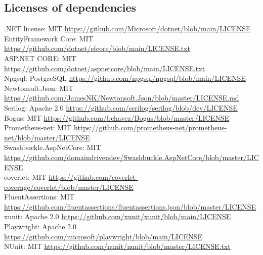\subsection{Licenses of dependencies}
.NET license: MIT \url{https://github.com/Microsoft/dotnet/blob/main/LICENSE}
\\
EntityFramework Core: MIT \url{https://github.com/dotnet/efcore/blob/main/LICENSE.txt}
\\
ASP.NET CORE: MIT
\url{https://github.com/dotnet/aspnetcore/blob/main/LICENSE.txt}
\\
Npgsql: PostgreSQL \url{https://github.com/npgsql/npgsql/blob/main/LICENSE}
\\
Newtonsoft.Json: MIT \url{https://github.com/JamesNK/Newtonsoft.Json/blob/master/LICENSE.md}
\\
Serilog: Apache 2.0 \url{https://github.com/serilog/serilog/blob/dev/LICENSE}
\\
Bogus: MIT \url{https://github.com/bchavez/Bogus/blob/master/LICENSE}
\\
Prometheus-net: MIT \url{https://github.com/prometheus-net/prometheus-net/blob/master/LICENSE}
\\
Swashbuckle.AspNetCore: MIT \url{https://github.com/domaindrivendev/Swashbuckle.AspNetCore/blob/master/LICENSE}
\\
coverlet: MIT \url{https://github.com/coverlet-coverage/coverlet/blob/master/LICENSE}
\\
FluentAssertions: MIT \url{https://github.com/fluentassertions/fluentassertions.json/blob/master/LICENSE}
\\
xunit: Apache 2.0 \url{https://github.com/xunit/xunit/blob/main/LICENSE}
\\
Playwright: Apache 2.0 \url{https://github.com/microsoft/playwright/blob/main/LICENSE}
\\
NUnit: MIT \url{https://github.com/nunit/nunit/blob/master/LICENSE.txt}
\\

